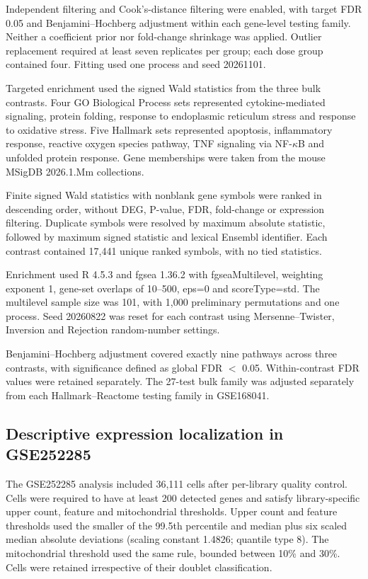 Independent filtering and Cook's-distance filtering were enabled, with target FDR 0.05 and Benjamini--Hochberg adjustment within each gene-level testing family. Neither a coefficient prior nor fold-change shrinkage was applied. Outlier replacement required at least seven replicates per group; each dose group contained four. Fitting used one process and seed 20261101.

Targeted enrichment used the signed Wald statistics from the three bulk contrasts. Four GO Biological Process sets represented cytokine-mediated signaling, protein folding, response to endoplasmic reticulum stress and response to oxidative stress. Five Hallmark sets represented apoptosis, inflammatory response, reactive oxygen species pathway, TNF signaling via NF-\(\kappa\)B and unfolded protein response. Gene memberships were taken from the mouse MSigDB 2026.1.Mm collections.

Finite signed Wald statistics with nonblank gene symbols were ranked in descending order, without DEG, P-value, FDR, fold-change or expression filtering. Duplicate symbols were resolved by maximum absolute statistic, followed by maximum signed statistic and lexical Ensembl identifier. Each contrast contained 17,441 unique ranked symbols, with no tied statistics.

Enrichment used R 4.5.3 and fgsea 1.36.2 with \textrm{fgseaMultilevel}, weighting exponent 1, gene-set overlaps of 10--500, \textrm{eps}=0 and \textrm{scoreType}=\textrm{std}. The multilevel sample size was 101, with 1,000 preliminary permutations and one process. Seed 20260822 was reset for each contrast using Mersenne--Twister, Inversion and Rejection random-number settings.

Benjamini--Hochberg adjustment covered exactly nine pathways across three contrasts, with significance defined as global FDR \(<\) 0.05. Within-contrast FDR values were retained separately. The 27-test bulk family was adjusted separately from each Hallmark--Reactome testing family in GSE168041.

\subsection{Descriptive expression localization in GSE252285}

The GSE252285 analysis included 36,111 cells after per-library quality control. Cells were required to have at least 200 detected genes and satisfy library-specific upper count, feature and mitochondrial thresholds. Upper count and feature thresholds used the smaller of the 99.5th percentile and median plus six scaled median absolute deviations (scaling constant 1.4826; quantile type 8). The mitochondrial threshold used the same rule, bounded between 10\% and 30\%. Cells were retained irrespective of their doublet classification.

